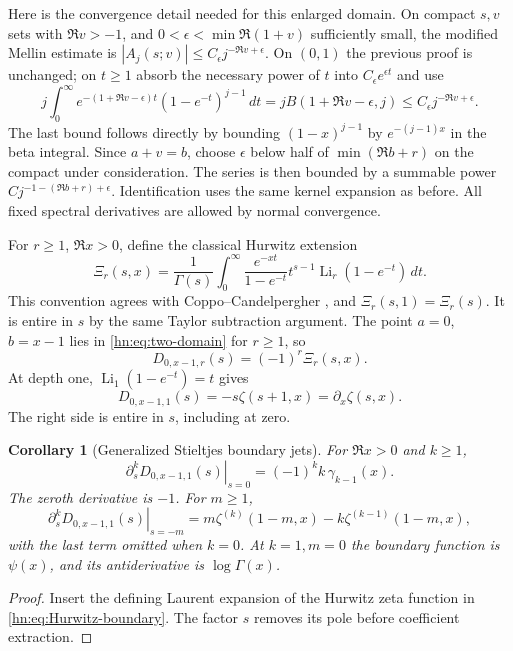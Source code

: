 \documentclass[11pt,a4paper]{article}
\numberwithin{equation}{section}
\newtheorem{corollary}[theorem]{Corollary}
\theoremstyle{definition}
\theoremstyle{remark}
\begin{document}
Here is the convergence detail needed for this enlarged domain.
On compact $s,v$ sets with $\Re v>-1$, and $0<\epsilon<\min\Re(1+v)$ sufficiently small, the modified Mellin estimate is
$|A_j(s;v)|\le C_\epsilon j^{-\Re v+\epsilon}$.
On $(0,1)$ the previous proof is unchanged; on $t\ge1$ absorb
the necessary power of $t$ into $C_\epsilon e^{\epsilon t}$ and use
\[
 j\int_0^\infty e^{-(1+\Re v-\epsilon)t}
                  (1-e^{-t})^{j-1}\,dt
 =jB(1+\Re v-\epsilon,j)
 \le C_\epsilon j^{-\Re v+\epsilon}.
\]
The last bound follows directly by bounding
$(1-x)^{j-1}$ by $e^{-(j-1)x}$ in the beta integral.
Since $a+v=b$, choose $\epsilon$ below half of
$\min(\Re b+r)$ on the compact under consideration. The series
is then bounded by a summable power
$Cj^{-1-(\Re b+r)+\epsilon}$. Identification uses the same
kernel expansion as before. All fixed spectral derivatives are
allowed by normal convergence.

For $r\ge1$, $\Re x>0$, define the classical Hurwitz extension
\[
 \Xi_r(s,x)=\frac1{\Gamma(s)}\int_0^\infty
       \frac{e^{-xt}}{1-e^{-t}}t^{s-1}
                        \operatorname{Li}_r(1-e^{-t})\,dt.
\]
This convention agrees with Coppo--Candelpergher \cite{CC2010}, and
$\Xi_r(s,1)=\Xi_r(s)$. It is entire in $s$ by the same Taylor
subtraction argument. The point $a=0$, $b=x-1$ lies in
\eqref{hn:eq:two-domain} for $r\ge1$, so
\begin{equation}\label{hn:eq:generalized-boundary}
                  D_{0,x-1,r}(s)=(-1)^r\Xi_r(s,x).
\end{equation}
At depth one, $\operatorname{Li}_1(1-e^{-t})=t$ gives
\begin{equation}\label{hn:eq:Hurwitz-boundary}
 D_{0,x-1,1}(s)=-s\zeta(s+1,x)=\partial_x\zeta(s,x).
\end{equation}
The right side is entire in $s$, including at zero.

\begin{corollary}[Generalized Stieltjes boundary jets]\label{hn:cor:Stieltjes}
For $\Re x>0$ and $k\ge1$,
\begin{equation}\label{hn:eq:generalized-Stieltjes}
 \boxed{\displaystyle
 \left.\partial_s^kD_{0,x-1,1}(s)\right|_{s=0}
      =(-1)^k k\,\gamma_{k-1}(x).}
\end{equation}
The zeroth derivative is $-1$. For $m\ge1$,
\[
 \left.\partial_s^kD_{0,x-1,1}(s)\right|_{s=-m}
 =m\zeta^{(k)}(1-m,x)-k\zeta^{(k-1)}(1-m,x),
\]
with the last term omitted when $k=0$.
At $k=1,m=0$ the boundary function is $\psi(x)$, and its
antiderivative is $\log\Gamma(x)$.
\end{corollary}
\begin{proof}
Insert the defining Laurent expansion of the Hurwitz zeta
function in \eqref{hn:eq:Hurwitz-boundary}. The factor $s$
removes its pole before coefficient extraction.
\end{proof}
\end{document}
